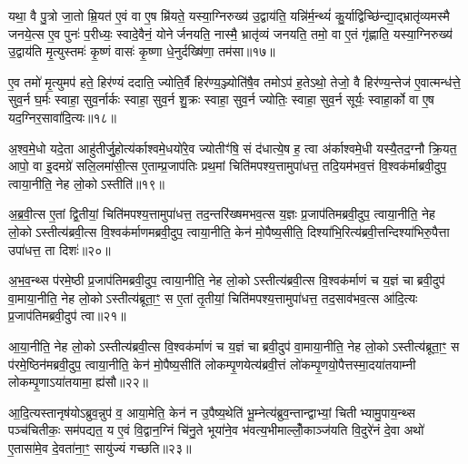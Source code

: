 {\anuvakamend[{भा॒ग॒धेय॒ञ्जुह्व॑ति पर॒मा रा॒ष्ट्रन्द॑धाति स॒प्त च॑॥४॥}]}

यथा॒ वै पु॒त्रो जा॒तो म्रि॒यत॑ ए॒वं वा ए॒ष म्रि॑यते॒ यस्या॒ग्निरुख्य॑ उ॒द्वाय॑ति॒ यन्नि॑र्म॒न्थ्यं॑ कु॒र्याद्विच्छि॑न्द्या॒द्भ्रातृ॑व्यमस्मै जनये॒त्स ए॒व पुनः॑ प॒रीध्यः॒ स्वादे॒वैनं॒ योनेर्जनयति॒ नास्मै॒ भ्रातृ॑व्यं जनयति॒ तमो॒ वा ए॒तं गृ॑ह्णाति॒ यस्या॒ग्निरुख्य॑ उ॒द्वाय॑ति मृ॒त्युस्तमः॑ कृ॒ष्णं वासः॑ कृ॒ष्णा धे॒नुर्दख्षि॑णा॒ तम॑सा॥१७॥

ए॒व तमो॑ मृ॒त्युमप॑ हते॒ हिर॑ण्यं ददाति॒ ज्योति॒र्वै हिर॑ण्य॒ञ्ज्योति॑षै॒व तमोऽप॑ ह॒तेऽथो॒ तेजो॒ वै हिर॑ण्य॒न्तेज॑ ए॒वात्मन्ध॑त्ते॒ सुव॒र्न घ॒र्मः स्वाहा॒ सुव॒र्नार्कः स्वाहा॒ सुव॒र्न शु॒क्रः स्वाहा॒ सुव॒र्न ज्योतिः॒ स्वाहा॒ सुव॒र्न सूर्यः॒ स्वाहा॒र्को वा ए॒ष यद॒ग्निर॒सावा॑दि॒त्यः॥१८॥

अ॒श्व॒मे॒धो यदे॒ता आहु॑तीर्जु॒होत्य॑र्काश्वमे॒धयो॑रे॒व ज्योतीꣳ॑षि॒ सं द॑धात्ये॒ष ह॒ त्वा अ॑र्काश्वमे॒धी यस्यै॒तद॒ग्नौ क्रि॒यत॒ आपो॒ वा इ॒दमग्रे॑ सलि॒लमा॑सी॒त्स ए॒ताम्प्र॒जाप॑तिः प्रथ॒मां चिति॑मपश्य॒त्तामुपा॑धत्त॒ तदि॒यम॑भव॒त्तं वि॒श्वक॑र्माब्रवी॒दुप॒ त्वाया॒नीति॒ नेह लो॒कोऽस्तीति॑॥१९॥

अ॒ब्र॒वी॒त्स ए॒तां द्वि॒तीयां॒ चिति॑मपश्य॒त्तामुपा॑धत्त॒ तद॒न्तरि॑ख्षमभव॒त्स य॒ज्ञः प्र॒जाप॑तिमब्रवी॒दुप॒ त्वाया॒नीति॒ नेह लो॒कोऽस्तीत्य॑ब्रवी॒त्स वि॒श्वक॑र्माणमब्रवी॒दुप॒ त्वाया॒नीति॒ केन॑ मो॒पैष्य॒सीति॒ दिश्या॑भि॒रित्य॑ब्रवी॒त्तन्दिश्या॑भिरु॒पैत्ता उपा॑धत्त॒ ता दिशः॑॥२०॥

अ॒भ॒व॒न्थ्स प॑रमे॒ष्ठी प्र॒जाप॑तिमब्रवी॒दुप॒ त्वाया॒नीति॒ नेह लो॒कोऽस्तीत्य॑ब्रवी॒त्स वि॒श्वक॑र्माणं च य॒ज्ञं चाब्रवी॒दुप॑ वा॒माया॒नीति॒ नेह लो॒कोऽस्तीत्य॑ब्रूता॒ꣳ॒ स ए॒तां तृ॒तीयां॒ चिति॑मपश्य॒त्तामुपा॑धत्त॒ तद॒साव॑भव॒त्स आ॑दि॒त्यः प्र॒जाप॑तिमब्रवी॒दुप॑ त्वा॥२१॥

आ॒या॒नीति॒ नेह लो॒कोऽस्तीत्य॑ब्रवी॒त्स वि॒श्वक॑र्माणं च य॒ज्ञं चाब्रवी॒दुप॑ वा॒माया॒नीति॒ नेह लो॒कोऽस्तीत्य॑ब्रूता॒ꣳ॒ स प॑रमे॒ष्ठिन॑मब्रवी॒दुप॒ त्वाया॒नीति॒ केन॑ मो॒पैष्य॒सीति॑ लोकम्पृ॒णयेत्य॑ब्रवी॒त्तं लो॑कम्पृ॒णयो॒पैत्तस्मा॒दया॑तयाम्नी लोकम्पृ॒णाऽया॑तयामा॒ ह्य॑सौ॥२२॥

आ॒दि॒त्यस्तानृष॑योऽब्रुव॒न्नुप॑ व॒ आया॒मेति॒ केन॑ न उ॒पैष्य॒थेति॑ भू॒म्नेत्य॑ब्रुव॒न्तान्द्वाभ्यां॒ चितीभ्यामु॒पाय॒न्थ्स पञ्च॑चितीकः॒ सम॑पद्यत॒ य ए॒वं वि॒द्वान॒ग्निं चि॑नु॒ते भूया॑ने॒व भ॑वत्य॒भीमाल्लोँ॒काञ्ज॑यति वि॒दुरे॑नं दे॒वा अथो॑ ए॒तासा॑मे॒व दे॒वता॑ना॒ꣳ॒ सायु॑ज्यं गच्छति॥२३॥

{\anuvakamend[{तम॑साऽऽदि॒त्योऽस्तीति॒ दिश॑ आदि॒त्यः प्र॒जाप॑तिमब्रवी॒दुप॑ त्वा॒ऽसौ पञ्च॑चत्वारिशच्च॥६॥}]}

